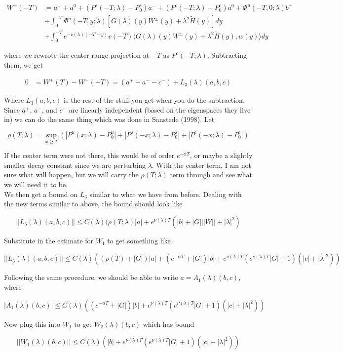 \documentclass[12pt]{article}
\begin{document}
\begin{enumerate}
\begin{align*}
W^-(-T) &= a^- + a^0 + (P^s(-T; \lambda) - P^s_0)a^- + (P^c(-T; \lambda) - P^c_0)a^0 +\Phi^u(-T, 0; \lambda)b^-  \\
&+ \int_0^{-T} \Phi^u(-T, y; \lambda)[ G(\lambda)(y)W^\pm(y) + \lambda^2 \tilde{H}(y) ] dy \\
&+ \int_0^{-T} 
e^{-\nu(\lambda)(-T-y)} v(-T) \langle G(\lambda)(y)W^\pm(y) + \lambda^2 \tilde{H}(y), w(y) \rangle dy 
\end{align*}

where we rewrote the center range projection at $-T$ as $P^c(-T; \lambda)$. Subtracting them, we get

\begin{align*}
0 &= W^+(T) - W^-(-T) = (a^+ - a^- - c^-) + L_3(\lambda)(a,b,c)
\end{align*}

Where $L_3(a,b,c)$ is the rest of the stuff you get when you do the subtraction. Since $a^+$, $a^-$, and $c^-$ are linearly independent (based on the eigenspaces they live in) we can do the same thing which was done in Sanstede (1998). Let

\[
\rho(T; \lambda) = \sup_{x \geq T} (|P^u(x;\lambda) - P_0^u| + |P^s(-x; \lambda) - P_0^s| + |P^c(-x;\lambda) - P_0^c| )
\]

If the center term were not there, this would be of order $e^{-\alpha T}$, or maybe a slightly smaller decay constant since we are perturbing $\lambda$. With the center term, I am not sure what will happen, but we will carry the $\rho(T; \lambda)$ term through and see what we will need it to be.\\

We then get a bound on $L_3$ similar to what we have from before. Dealing with the new terms similar to above, the bound should look like

\[
||L_3(\lambda)(a,b,c)|| \leq C(\lambda)(\rho(T; \lambda)|a| + e^{\nu(\lambda)T}( |b| + |G|||W|| + |\lambda|^2 )
\]

Substitute in the estimate for $W_1$ to get something like

\[
||L_3(\lambda)(a,b,c)|| \leq C(\lambda)((\rho(T) + |G|)|a| + (e^{-\alpha T} + |G|)|b| + e^{\nu(\lambda)T}(e^{\nu(\lambda)T}|G| + 1)(|c| + |\lambda|^2 ))
\]

Following the same procedure, we should be able to write $a = A_1(\lambda)(b,c)$, where

\[
|A_1(\lambda)(b,c)| \leq C(\lambda)((e^{-\alpha T} + |G|)|b| + e^{\nu(\lambda)T}(e^{\nu(\lambda)T}|G| + 1)(|c| + |\lambda|^2 ))
\]

Now plug this into $W_1$ to get $W_2(\lambda)(b,c)$ which has bound

\[
||W_1(\lambda)(b,c)|| \leq C(\lambda)(|b| + e^{\nu(\lambda)T}(e^{\nu(\lambda)T}|G| + 1)(|c| + |\lambda|^2 ))
\]



\end{enumerate}
\end{document}

